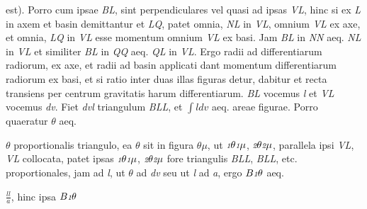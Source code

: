 est\lbrack)\rbrack. Porro cum ipsae \textit{BL}, sint perpendiculares vel quasi ad ipsas \textit{VL}, hinc si ex \textit{L} in axem et basin demittantur 
et \textit{LQ}, patet omnia, \textit{NL} in \textit{VL}, 
omnium \textit{VL} ex axe, et omnia, \textit{LQ} in \textit{VL} esse momentum omnium \textit{VL} ex basi. Jam \textit{BL} in \textit{NN} aeq. \textit{NL} in \textit{VL} et similiter \textit{BL} in \textit{QQ} aeq. \textit{QL} in \textit{VL}. Ergo radii ad 
differentiarum radiorum, ex axe, et radii ad basin applicati dant momentum differentiarum radiorum ex basi, et si ratio inter duas illas figuras detur, dabitur et recta transiens per centrum gravitatis harum differentiarum. \textit{BL} vocemus \textit{l} et \textit{VL} vocemus \textit{dv}. Fiet \textit{dvl} triangulum \textit{BLL}, et $\int ldv$ aeq. areae figurae. 
Porro quaeratur $\theta$ aeq. 
\rule[-3mm]{0pt}{8mm}%
$\theta$ proportionalis triangulo, ea $\theta$ sit in figura $\theta\mu$, ut $\ind{1}\theta\ind{1}\mu$, $\ind{2}\theta\ind{2}\mu$, parallela ipsi \textit{VL}, \textit{VL} collocata, patet ipsas $\ind{1}\theta\ind{1}\mu$, $\ind{2}\theta\ind{2}\mu$ fore triangulis \textit{BLL}, \textit{BLL}, etc. proportionales, jam 
ad \textit{l}, ut $\theta$ ad \textit{dv} seu ut \textit{l} ad \textit{a}, ergo $B\ind{1}\theta$ aeq. \rule[-3mm]{0pt}{8mm}$\displaystyle\frac{ll}{a}$, hinc ipsa $B\ind{1}\theta$ \rule[-3mm]{0pt}{8mm}%
